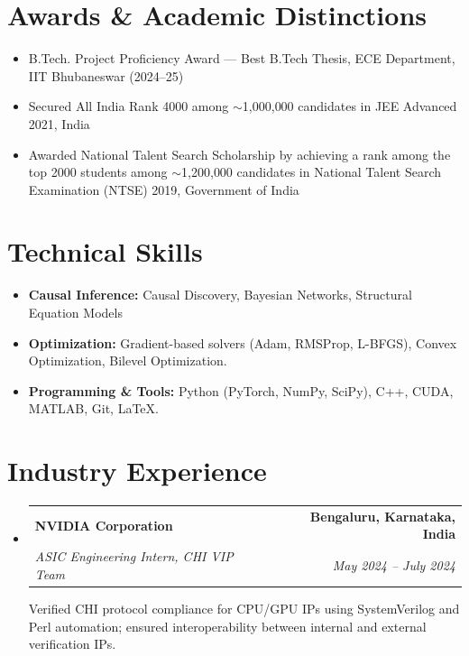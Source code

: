 \documentclass[10pt,letterpaper]{article}
\makeatletter
\newcommand{\resumeSubheading}[4]{
  \vspace{-1pt}\item
    \begin{tabular*}{0.99\textwidth}[t]{l@{\extracolsep{\fill}}r}
      \textbf{#1} & \textbf{#2} \\
      \textit{\small#3} & \textit{\small #4} \\
    \end{tabular*}\vspace{-5pt}
}
\newcommand{\resumeSubHeadingListStart}{\begin{itemize}[leftmargin=*, label={}]}
\newcommand{\resumeSubHeadingListEnd}{\end{itemize}}
\makeatother
\begin{document}
\section{Awards \& Academic Distinctions}
\begin{itemize}[leftmargin=*, noitemsep]
  \item B.Tech. Project Proficiency Award --- Best B.Tech Thesis, ECE Department, IIT Bhubaneswar (2024--25)
  \item Secured All India Rank 4000 among $\sim$1{,}000{,}000 candidates in JEE Advanced 2021, India
  \item Awarded National Talent Search Scholarship by achieving a rank among the top 2000 students among $\sim$1{,}200{,}000 candidates in National Talent Search Examination (NTSE) 2019, Government of India
\end{itemize}

\section{Technical Skills}
 \begin{itemize}[leftmargin=*, noitemsep]
    \item \textbf{Causal Inference:} Causal Discovery, Bayesian Networks, Structural Equation Models
    \item \textbf{Optimization:} Gradient-based solvers (Adam, RMSProp, L-BFGS), Convex Optimization, Bilevel Optimization.
    \item \textbf{Programming \& Tools:} Python (PyTorch, NumPy, SciPy), C++, CUDA, MATLAB, Git, LaTeX.
 \end{itemize}

\section{Industry Experience}
  \resumeSubHeadingListStart
    \resumeSubheading
      {NVIDIA Corporation}{Bengaluru, Karnataka, India}
      {ASIC Engineering Intern, CHI VIP Team}{May 2024 -- July 2024}
      \vspace{8pt}
      \newline
      Verified CHI protocol compliance for CPU/GPU IPs using SystemVerilog and Perl automation; ensured interoperability between internal and external verification IPs.
  \resumeSubHeadingListEnd
\end{document}
